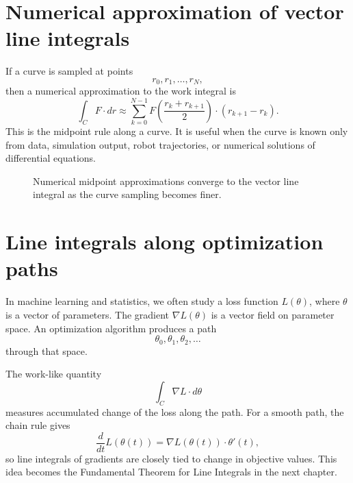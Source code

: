 \documentclass[11pt,oneside]{book}
\begin{document}
\section{Numerical approximation of vector line integrals}

If a curve is sampled at points
\[
r_0,r_1,\ldots,r_N,
\]
then a numerical approximation to the work integral is
\[
\int_C F\cdot dr\approx \sum_{k=0}^{N-1}F\left(\frac{r_k+r_{k+1}}{2}\right)\cdot (r_{k+1}-r_k).
\]
This is the midpoint rule along a curve. It is useful when the curve is known only from data, simulation output, robot trajectories, or numerical solutions of differential equations.

\begin{figure}[H]
\centering
{}
\caption{Numerical midpoint approximations converge to the vector line integral as the curve sampling becomes finer.}
\end{figure}

\section{Line integrals along optimization paths}

In machine learning and statistics, we often study a loss function $L(\theta)$, where $\theta$ is a vector of parameters. The gradient $\nabla L(\theta)$ is a vector field on parameter space. An optimization algorithm produces a path
\[
\theta_0,\theta_1,\theta_2,\ldots
\]
through that space.

The work-like quantity
\[
\int_C \nabla L\cdot d\theta
\]
measures accumulated change of the loss along the path. For a smooth path, the chain rule gives
\[
\frac{d}{dt}L(\theta(t))=\nabla L(\theta(t))\cdot \theta'(t),
\]
so line integrals of gradients are closely tied to change in objective values. This idea becomes the Fundamental Theorem for Line Integrals in the next chapter.
\end{document}
